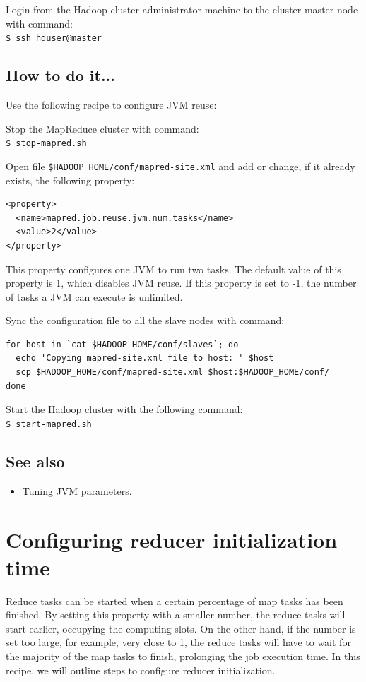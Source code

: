Login from the Hadoop cluster administrator machine to the cluster master node with command: \\
\verb|$ ssh hduser@master|
\subsection*{How to do it...}
Use the following recipe to configure JVM reuse:

Stop the MapReduce cluster with command:\\
\verb|$ stop-mapred.sh|

Open file \verb|$HADOOP_HOME/conf/mapred-site.xml| and add or change, if it already exists, the following property:
\lstset{style=bashstyle}
\begin{lstlisting}
<property>
  <name>mapred.job.reuse.jvm.num.tasks</name>
  <value>2</value>
</property>
\end{lstlisting}

This property configures one JVM to run two tasks. The default value of this property is 1, which disables JVM reuse. If this property is set to -1, the number of tasks a JVM can execute is unlimited.

Sync the configuration file to all the slave nodes with command:
\lstset{style=bashstyle}
\begin{lstlisting}
for host in `cat $HADOOP_HOME/conf/slaves`; do
  echo 'Copying mapred-site.xml file to host: ' $host
  scp $HADOOP_HOME/conf/mapred-site.xml $host:$HADOOP_HOME/conf/
done
\end{lstlisting}


Start the Hadoop cluster with the following command: \\
\verb|$ start-mapred.sh|

\subsection*{See also}
\begin{itemize}
  \item Tuning JVM parameters.
\end{itemize}
\section{Configuring reducer initialization time}
Reduce tasks can be started when a certain percentage of map tasks has been finished. By setting this property with a smaller number, the reduce tasks will start earlier, occupying the computing slots. On the other hand, if the number is set too large, for example, very close to 1, the reduce tasks will have to wait for the majority of the map tasks to finish, prolonging the job execution time. In this recipe, we will outline steps to configure reducer initialization.

